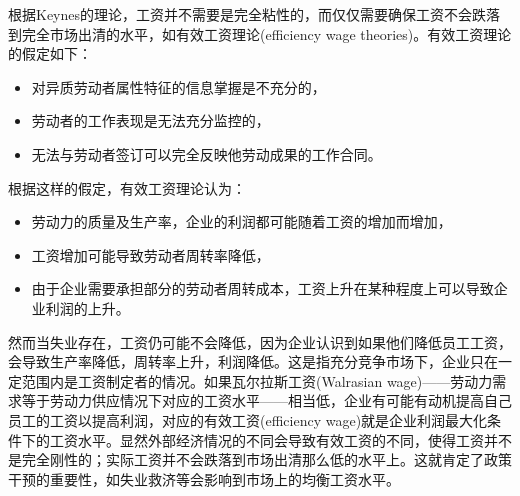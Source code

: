 根据Keynes的理论，工资并不需要是完全粘性的，而仅仅需要确保工资不会跌落到完全市场出清的水平，如有效工资理论(efficiency wage theories\citep{Stiglitz:1984ud,Stiglitz:1987bz})。有效工资理论的假定如下：
\begin{itemize}
\item 对异质劳动者属性特征的信息掌握是不充分的，
\item 劳动者的工作表现是无法充分监控的，
\item 无法与劳动者签订可以完全反映他劳动成果的工作合同。
\end{itemize}

根据这样的假定，有效工资理论认为：
\begin{itemize}
\item 劳动力的质量及生产率，企业的利润都可能随着工资的增加而增加，
\item 工资增加可能导致劳动者周转率降低，
\item 由于企业需要承担部分的劳动者周转成本，工资上升在某种程度上可以导致企业利润的上升。
\end{itemize}

然而当失业存在，工资仍可能不会降低，因为企业认识到如果他们降低员工工资，会导致生产率降低，周转率上升，利润降低。这是指充分竞争市场下，企业只在一定范围内是工资制定者的情况。如果瓦尔拉斯工资(Walrasian wage)——劳动力需求等于劳动力供应情况下对应的工资水平——相当低，企业有可能有动机提高自己员工的工资以提高利润，对应的有效工资(efficiency wage)就是企业利润最大化条件下的工资水平。显然外部经济情况的不同会导致有效工资的不同，使得工资并不是完全刚性的；实际工资并不会跌落到市场出清那么低的水平上。这就肯定了政策干预的重要性，如失业救济等会影响到市场上的均衡工资水平。

